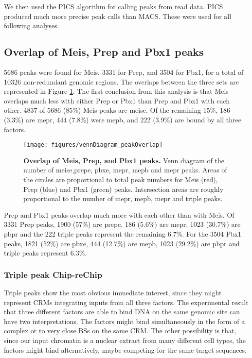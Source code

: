 We then used the \ac{PICS} algorithm \parencite{Zhang2011} for calling peaks from read data. \ac{PICS} produced much more precise peak calls than \ac{MACS}. These were used for all following analyses.

\subsection{Overlap of Meis, Prep and Pbx1 peaks}

5686 peaks were found for Meis, 3331 for Prep, and 3504 for Pbx1, for a total of 10326 non-redundant genomic regions. The overlaps between the three sets are represented in Figure \ref{fig:peakOverlap}. The first conclusion from this analysis is that Meis overlaps much less with either Prep or Pbx1 than Prep and Pbx1 with each other. 4837 of 5686 (85\%) Meis peaks are \ac{meise}. Of the remaining 15\%, 186 (3.3\%) are \ac{mepr}, 444 (7.8\%) were \ac{mepb}, and 222 (3.9\%) are bound by all three factors. 


\begin{figure}[]
  \centering
  \texttt{[image: figures/vennDiagram\_peakOverlap]}
  \caption[Overlap of Meis, Prep, and Pbx1 peaks]{\textbf{Overlap of Meis, Prep, and Pbx1 peaks.} Venn diagram of the number of \ac{meise},\ac{prepe}, \ac{pbxe}, \ac{mepr}, \ac{mepb} and \ac{mepr} peaks. Areas of the circles are proportional to total peak numbers for Meis (red), Prep (blue) and Pbx1 (green) peaks. Intersection areas are roughly proportional to the number of \ac{mepr}, \ac{mepb}, \ac{mepr} and triple peaks.}
  \label{fig:peakOverlap}
\end{figure}

Prep and Pbx1 peaks overlap much more with each other than with Meis. Of 3331 Prep peaks, 1900 (57\%) are \ac{prepe},  186 (5.6\%) are \ac{mepr}, 1023 (30.7\%) are \ac{pbpr} and the 222 triple peaks represent the remaining 6.7\%. For the 3504 Pbx1 peaks, 1821 (52\%) are \ac{pbxe}, 444 (12.7\%) are \ac{mepb}, 1023 (29.2\%) are \ac{pbpr} and triple peaks represent 6.3\%. 


\subsubsection{Triple peak Chip-reChip}

Triple peaks show the most obvious immediate interest, since they might represent \acp{CRM} integrating inputs from all three factors. The experimental result that three different factors are able to bind DNA on the same genomic site can have two interpretations. The factors might bind simultaneously in the form of a complex or to very close \acp{BS} on the same \ac{CRM}. The other possibility is that, since our input chromatin is a nuclear extract from many different cell types, the factors might bind alternatively, maybe competing for the same target sequences.

